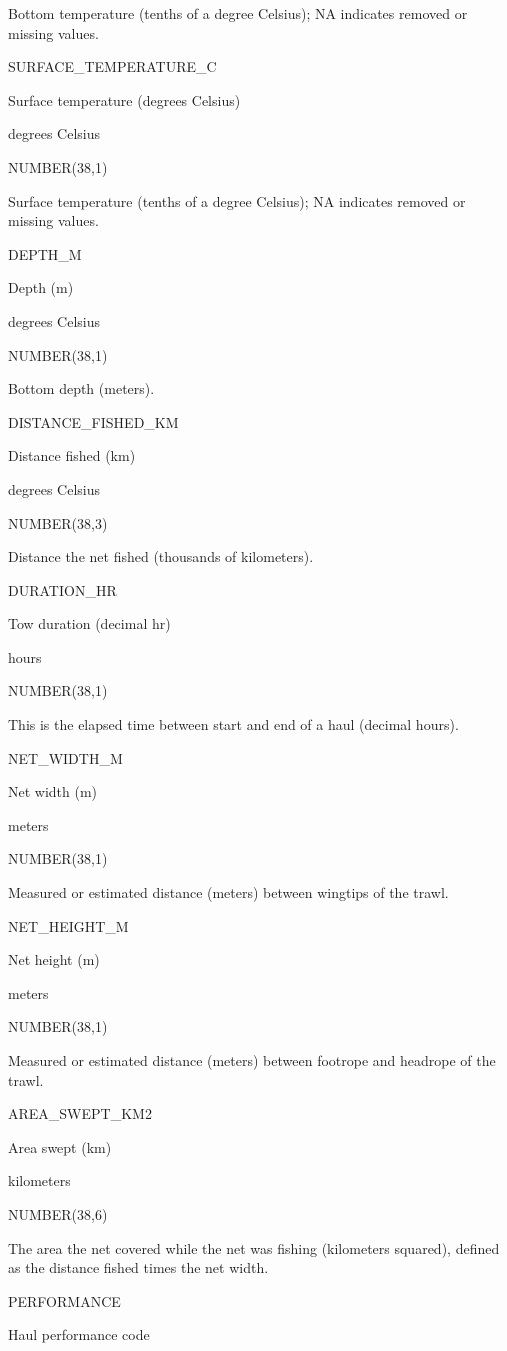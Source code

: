 \documentclass[
  letterpaper,
  oneside,
  open=any]{scrbook}
\begin{document}
Bottom temperature (tenths of a degree Celsius); NA indicates removed or
missing values.

SURFACE\_TEMPERATURE\_C

Surface temperature (degrees Celsius)

degrees Celsius

NUMBER(38,1)

Surface temperature (tenths of a degree Celsius); NA indicates removed
or missing values.

DEPTH\_M

Depth (m)

degrees Celsius

NUMBER(38,1)

Bottom depth (meters).

DISTANCE\_FISHED\_KM

Distance fished (km)

degrees Celsius

NUMBER(38,3)

Distance the net fished (thousands of kilometers).

DURATION\_HR

Tow duration (decimal hr)

hours

NUMBER(38,1)

This is the elapsed time between start and end of a haul (decimal
hours).

NET\_WIDTH\_M

Net width (m)

meters

NUMBER(38,1)

Measured or estimated distance (meters) between wingtips of the trawl.

NET\_HEIGHT\_M

Net height (m)

meters

NUMBER(38,1)

Measured or estimated distance (meters) between footrope and headrope of
the trawl.

AREA\_SWEPT\_KM2

Area swept (km)

kilometers

NUMBER(38,6)

The area the net covered while the net was fishing (kilometers squared),
defined as the distance fished times the net width.

PERFORMANCE

Haul performance code
\end{document}
